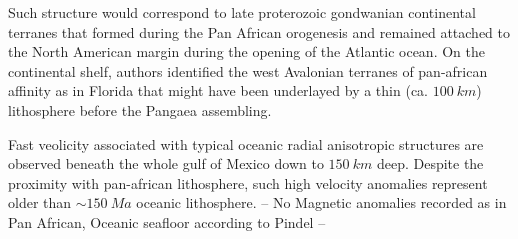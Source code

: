 \documentclass[12pt]{article}
\begin{document}
		Such structure would correspond to late proterozoic gondwanian continental terranes that formed during the Pan African orogenesis \citep{kennedy1964structural} and remained attached to the North American margin during the opening of the Atlantic ocean. \citep[e.g.][]{thomas2006tectonic}
		On the continental shelf, authors \citep[e.g.][]{o1983avalon,nance2002cordilleran} identified the west Avalonian terranes of pan-african affinity as in Florida \citep[see][]{smith1982review} that might have been underlayed by a thin (ca. $100 \: km$) lithosphere before the Pangaea assembling. \citep{mckenzie2015lithospheric}

		Fast veolicity associated with typical oceanic radial anisotropic structures are observed beneath the whole gulf of Mexico down to $150 \: km$ deep. Despite the proximity with pan-african lithosphere, such high velocity anomalies represent older than $\sim 150 \: Ma$ oceanic lithosphere. \citep{muller2008age,pindell2009tectonic}
		-- No Magnetic anomalies recorded as in Pan African, Oceanic seafloor according to Pindel --




\end{document}
